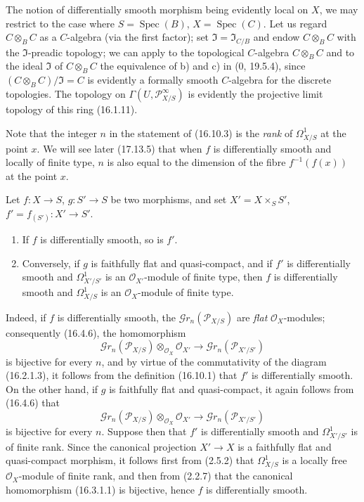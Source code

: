 The notion of differentially smooth morphism being evidently local on
$X$, we may restrict to the case where $S=\operatorname{Spec}(B)$,
$X=\operatorname{Spec}(C)$. Let us regard $C\otimes_B C$ as a $C$-algebra
(via the first factor); set $\mathfrak{I}=\mathfrak{I}_{C/B}$ and
endow $C\otimes_B C$ with the $\mathfrak{I}$-preadic topology; we can
apply to the topological $C$-algebra $C\otimes_B C$ and to the ideal
$\mathfrak{I}$ of $C\otimes_B C$ the equivalence of b) and c) in
(0, 19.5.4), since $(C\otimes_B C)/\mathfrak{I}=C$ is evidently a formally
smooth $C$-algebra for the discrete topologies. The topology on
$\Gamma(U,\mathscr{P}_{X/S}^{\infty})$ is evidently the projective limit
topology of this ring (16.1.11).

Note that the integer $n$ in the statement of (16.10.3) is the \emph{rank}
of $\Omega_{X/S}^1$ at the point $x$. We will see later (17.13.5) that when
$f$ is differentially smooth and locally of finite type, $n$ is also
equal to the dimension of the fibre $f^{-1}(f(x))$ at the point $x$.

\begin{proposition}[16.10.4]
\label{IV.16.10.4}
Let $f:X\to S$, $g:S'\to S$ be two morphisms, and set
$X'=X\times_S S'$, $f'=f_{(S')}:X'\to S'$.
\begin{enumerate}
  \item[(i)] If $f$ is differentially smooth, so is $f'$.
  \item[(ii)] Conversely, if $g$ is faithfully flat and quasi-compact, and if
  $f'$ is differentially smooth and $\Omega_{X'/S'}^1$ is an
  $\mathcal{O}_{X'}$-module of finite type, then $f$ is differentially smooth
  and $\Omega_{X/S}^1$ is an $\mathcal{O}_X$-module of finite type.
\end{enumerate}
\end{proposition}

Indeed, if $f$ is differentially smooth, the
$\mathscr{G}r_n(\mathscr{P}_{X/S})$ are \emph{flat}
$\mathcal{O}_X$-modules; consequently (16.4.6), the homomorphism
\[
  \mathscr{G}r_n(\mathscr{P}_{X/S})\otimes_{\mathcal{O}_X}\mathcal{O}_{X'}
  \longrightarrow\mathscr{G}r_n(\mathscr{P}_{X'/S'})
\]
is bijective for every $n$, and by virtue of the commutativity of the diagram
(16.2.1.3), it follows from the definition (16.10.1) that $f'$ is
differentially smooth. On the other hand, if $g$ is faithfully flat and
quasi-compact, it again follows from (16.4.6) that
\[
  \mathscr{G}r_n(\mathscr{P}_{X/S})\otimes_{\mathcal{O}_X}\mathcal{O}_{X'}
  \longrightarrow\mathscr{G}r_n(\mathscr{P}_{X'/S'})
\]
is bijective for every $n$. Suppose then that $f'$ is differentially smooth
and $\Omega_{X'/S'}^1$ is of finite rank. Since the canonical projection
$X'\to X$ is a faithfully flat and quasi-compact morphism, it follows first
from (2.5.2) that $\Omega_{X/S}^1$ is a locally free $\mathcal{O}_X$-module of
finite rank, and then from (2.2.7) that the canonical homomorphism (16.3.1.1)
is bijective, hence $f$ is differentially smooth.

